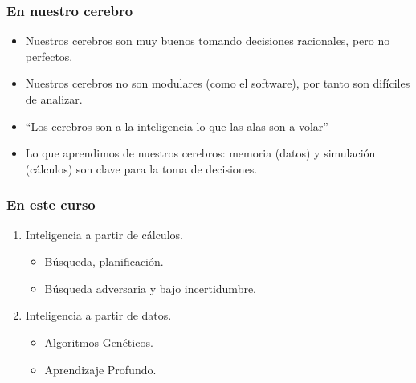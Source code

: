 \documentclass[10pt]{beamer}
\begin{document}
\begin{frame}
    \frametitle{En nuestro cerebro}
    \begin{itemize}
        \item Nuestros cerebros son muy buenos tomando decisiones racionales, \alert{pero no perfectos}.
        \item Nuestros cerebros no son modulares (como el software), por tanto son difíciles de analizar.
        \item ``Los cerebros son a la inteligencia lo que las alas son a volar''
        \item Lo que aprendimos de nuestros cerebros: memoria (datos) y simulación (cálculos) son 
        clave para la toma de decisiones.
    \end{itemize}
\end{frame}

\begin{frame}
    \frametitle{En este curso}
    \begin{enumerate}
        \item Inteligencia a partir de cálculos.
            \begin{itemize}
                \item Búsqueda, planificación.
                \item Búsqueda adversaria y bajo incertidumbre.
            \end{itemize}
        \item Inteligencia a partir de datos.
            \begin{itemize}
                \item Algoritmos Genéticos.
                \item Aprendizaje Profundo.
            \end{itemize}
    \end{enumerate}
\end{frame}
\end{document}
